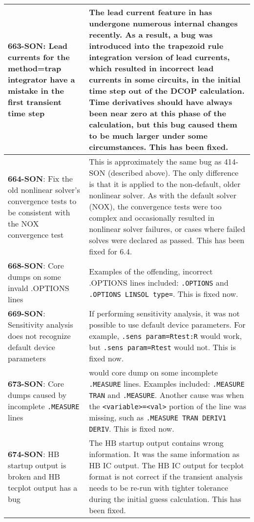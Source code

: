 {\begin{longtable}[h] {>{\raggedright\small}m{2in}|>{\raggedright\let\\\tabularnewline\small}m{3.5in}}
     \textbf{663-SON}:  Lead currents for the method=trap integrator have a
     mistake in the first transient time step  &  The lead current feature in
     \Xyce{} has undergone numerous internal changes recently.  As a result, a bug
     was introduced into the trapezoid rule integration version of lead
     currents, which resulted in incorrect lead currents in some circuits, in
     the initial time step out of the DCOP calculation.  Time derivatives
     should have always been near zero at this phase of the calculation, but
     this bug caused them to be much larger under some circumstances.  This has
     been fixed.  
     \\ \hline 

     \textbf{664-SON}: Fix the old nonlinear solver's convergence tests to be 
     consistent with the NOX convergence test & This is approximately the same
     bug as 414-SON (described above).  The only difference is that it is applied
     to the non-default, older nonlinear solver.  As with the default solver (NOX),
     the convergence tests were too complex and occasionally resulted in 
     nonlinear solver failures, or cases where failed solves were declared
     as passed.  This has been fixed for \Xyce{} 6.4.
     \\ \hline 

     \textbf{668-SON}: \Xyce{} Core dumps on some invald .OPTIONS lines &
     Examples of the offending, incorrect .OPTIONS lines included:
     \texttt{.OPTIONS} and \texttt{.OPTIONS LINSOL type=}. This is fixed now.
     \\ \hline

     \textbf{669-SON}: Sensitivity analysis does not recognize default device parameters &
     If performing sensitivity analysis, it was not possible to use default device parameters.
     For example, \texttt{.sens param=Rtest:R} would work, but \texttt{.sens param=Rtest} would not.
     This is fixed now.
     \\ \hline

     \textbf{673-SON}: Core dumps caused by incomplete \texttt{.MEASURE} lines & \Xyce{}
     would core dump on some incomplete \texttt{.MEASURE} lines.  Examples included:
     \texttt{.MEASURE TRAN} and \texttt{.MEASURE}.  Another cause was when the
     \texttt{<variable>=<val>} portion of the line was missing, such as
     \texttt{.MEASURE TRAN DERIV1 DERIV}.  This is fixed now.  
     \\ \hline


\textbf{674-SON}: HB startup output is broken and HB tecplot output
has a bug   & The HB startup output contains wrong information. It
was the same information as HB IC output. The HB IC output for tecplot
format is not correct if the transient analysis needs to be re-run
with tighter tolerance during the initial guess calculation. This has
been fixed.
\\ \hline


\end{longtable}}
